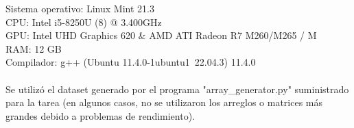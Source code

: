 
\noindent
Sistema operativo: Linux Mint 21.3 \\
CPU: Intel i5-8250U (8) @ 3.400GHz \\
GPU: Intel UHD Graphics 620 \& AMD ATI Radeon R7 M260/M265 / M \\
RAM: 12 GB \\
Compilador: g++ (Ubuntu 11.4.0-1ubuntu1~22.04.3) 11.4.0 \\ \\
Se utilizó el dataset generado por el programa "array\_generator.py" suministrado para la tarea (en algunos casos, no se utilizaron los arreglos o matrices más grandes debido a problemas de rendimiento).

